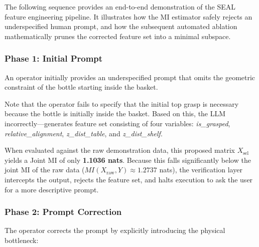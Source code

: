 \documentclass[journal]{IEEEtran}
\begin{document}
The following sequence provides an end-to-end demonstration of the SEAL feature engineering pipeline. It illustrates how the MI estimator safely rejects an underspecified human prompt, and how the subsequent automated ablation mathematically prunes the corrected feature set into a minimal subspace.

\subsubsection{Phase 1: Initial Prompt}
An operator initially provides an underspecified prompt that omits the geometric constraint of the bottle starting inside the basket.

\vspace{0.5em}
\noindent{}
\vspace{0.5em}

Note that the operator fails to specify that the initial top grasp is necessary because the bottle is initially inside the basket. Based on this, the LLM  incorrectly—generates feature set consisting of four variables: \textit{is\_grasped}, \textit{relative\_alignment}, \textit{z\_dist\_table}, and \textit{z\_dist\_shelf}. 

When evaluated against the raw demonstration data, this proposed matrix $X_{\text{sel}}$ yields a Joint MI of only \textbf{1.1036 nats}. Because this falls significantly below the joint MI of the raw data ($MI(X_{\text{raw}},Y) \approx 1.2737$ nats), the verification layer intercepts the output, rejects the feature set, and halts execution to ask the user for a more descriptive prompt.

\subsubsection{Phase 2: Prompt Correction}
The operator corrects the prompt by explicitly introducing the physical bottleneck:

\vspace{0.5em}
\noindent{}
\vspace{0.5em}
\end{document}

